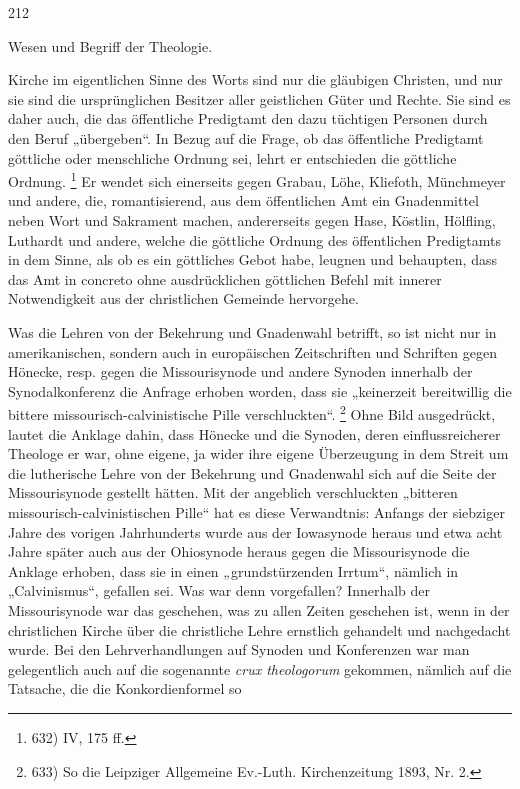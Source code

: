 \centerline{212}\centerline{Wesen und Begriff der Theologie.}\par Kirche im eigentlichen Sinne des Worts sind nur die gläubigen Christen, und nur sie sind die ursprünglichen Besitzer aller geistlichen Güter und Rechte. Sie sind es daher auch, die das öffentliche Predigtamt den dazu tüchtigen Personen durch den Beruf „übergeben“. In Bezug auf die Frage, ob das öffentliche Predigtamt göttliche oder menschliche Ordnung sei, lehrt er entschieden die göttliche Ordnung. \footnote{632) IV, 175 ff.} Er wendet sich einerseits gegen Grabau, Löhe, Kliefoth, Münchmeyer und andere, die, romantisierend, aus dem öffentlichen Amt ein Gnadenmittel neben Wort und Sakrament machen, andererseits gegen Hase, Köstlin, Hölfling, Luthardt und andere, welche die göttliche Ordnung des öffentlichen Predigtamts in dem Sinne, als ob es ein göttliches Gebot habe, leugnen und behaupten, dass das Amt in concreto ohne ausdrücklichen göttlichen Befehl mit innerer Notwendigkeit aus der christlichen Gemeinde hervorgehe.\par Was die Lehren von der Bekehrung und Gnadenwahl betrifft, so ist nicht nur in amerikanischen, sondern auch in europäischen Zeitschriften und Schriften gegen Hönecke, resp. gegen die Missourisynode und andere Synoden innerhalb der Synodalkonferenz die Anfrage erhoben worden, dass sie „keinerzeit bereitwillig die bittere missourisch-calvinistische Pille verschluckten“. \footnote{633) So die Leipziger Allgemeine Ev.-Luth. Kirchenzeitung 1893, Nr. 2.} Ohne Bild ausgedrückt, lautet die Anklage dahin, dass Hönecke und die Synoden, deren einflussreicherer Theologe er war, ohne eigene, ja wider ihre eigene Überzeugung in dem Streit um die lutherische Lehre von der Bekehrung und Gnadenwahl sich auf die Seite der Missourisynode gestellt hätten. Mit der angeblich verschluckten „bitteren missourisch-calvinistischen Pille“ hat es diese Verwandtnis: Anfangs der siebziger Jahre des vorigen Jahrhunderts wurde aus der Iowasynode heraus und etwa acht Jahre später auch aus der Ohiosynode heraus gegen die Missourisynode die Anklage erhoben, dass sie in einen „grundstürzenden Irrtum“, nämlich in „Calvinismus“, gefallen sei. Was war denn vorgefallen? Innerhalb der Missourisynode war das geschehen, was zu allen Zeiten geschehen ist, wenn in der christlichen Kirche über die christliche Lehre ernstlich gehandelt und nachgedacht wurde. Bei den Lehrverhandlungen auf Synoden und Konferenzen war man gelegentlich auch auf die sogenannte \emph{crux theologorum} gekommen, nämlich auf die Tatsache, die die Konkordienformel so